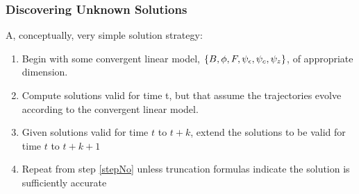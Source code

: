 \documentclass[letter]{beamer}
\begin{document}
\begin{frame}
  \frametitle{Discovering Unknown Solutions}

A, conceptually, very simple solution strategy:  

  \begin{enumerate}
  \item Begin with some convergent linear model, ${\{B,\phi,F,\psi_\epsilon,\psi_c,\psi_z\}}$, of appropriate dimension.
  \item Compute solutions valid for time t, 
but that assume the trajectories evolve according to the convergent linear model.
  \item Given solutions valid for time $t$ to $t+k$, extend the solutions to be valid for time $t$ to $t+k+1$ \label{stepNo}
\item Repeat from step \ref{stepNo} unless truncation formulas indicate the solution is sufficiently accurate
  \end{enumerate}


\end{frame}
\end{document}
